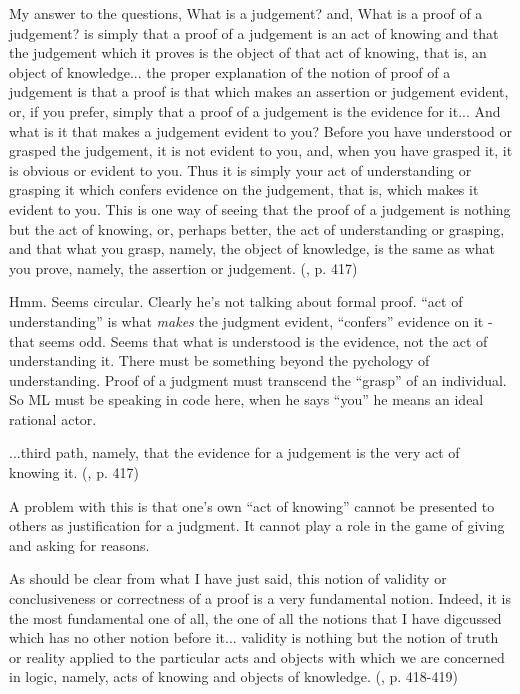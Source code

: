 \documentclass{article}
\begin{document}
\begin{displayquote}
My answer to the questions, What is a judgement? and, What is a proof
of a judgement? is simply that a proof of a judgement is an act of
knowing and that the judgement which it proves is the object of that
act of knowing, that is, an object of knowledge... the proper explanation of the notion of proof of a judgement is that a proof is that which makes an assertion or judgement evident, or, if you prefer, simply that a proof of a judgement is the evidence for it...
And what is it that makes a judgement evident to you? Before you have understood or grasped the judgement, it is not evident to you, and, when you have grasped it, it is obvious or evident to you. Thus it is simply your act of understanding or grasping it which confers evidence on the judgement, that is, which makes it evident to you. This is one way of seeing that the proof of a judgement is nothing but the act of knowing, or, perhaps better, the act of understanding or grasping, and that what you grasp, namely, the object of knowledge, is the same as what you prove, namely, the assertion or judgement.
(\parencite{martin1987truth}, p. 417)
\end{displayquote}

Hmm. Seems circular. Clearly he's not talking about formal proof.
``act of understanding'' is what \textit{makes} the judgment evident,
``confers'' evidence on it - that seems odd. Seems that what is
understood is the evidence, not the act of understanding it. There
must be something beyond the pychology of understanding. Proof of a
judgment must transcend the ``grasp'' of an individual. So ML must be
speaking in code here, when he says ``you'' he means an ideal rational
actor.

\begin{displayquote}
...third path, namely, that the evidence for a judgement is the very act of knowing it.
(\parencite{martin1987truth}, p. 417)
\end{displayquote}

A problem with this is that one's own ``act of knowing'' cannot be presented to others as justification for a judgment. It cannot play a role in the game of giving and asking for reasons.


\begin{displayquote}
As should be clear from what I have just said, this notion of validity
or conclusiveness or correctness of a proof is a very fundamental
notion. Indeed, it is the most fundamental one of all, the one of all
the notions that I have digcussed which has no other notion before
it... validity is nothing but the notion of truth or reality applied
to the particular acts and objects with which we are concerned in
logic, namely, acts of knowing and objects of knowledge.
(\parencite{martin1987truth}, p. 418-419)
\end{displayquote}
\end{document}
